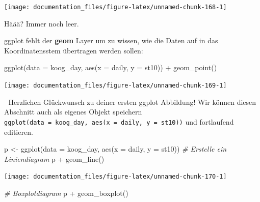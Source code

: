 \documentclass[
]{article}
\newenvironment{Shaded}{\begin{snugshade}}{\end{snugshade}}
\newcommand{\AttributeTok}[1]{\textcolor[rgb]{0.77,0.63,0.00}{#1}}
\newcommand{\CommentTok}[1]{\textcolor[rgb]{0.56,0.35,0.01}{\textit{#1}}}
\newcommand{\FunctionTok}[1]{\textcolor[rgb]{0.00,0.00,0.00}{#1}}
\newcommand{\NormalTok}[1]{#1}
\newcommand{\OtherTok}[1]{\textcolor[rgb]{0.56,0.35,0.01}{#1}}
\newcommand{\SpecialCharTok}[1]{\textcolor[rgb]{0.00,0.00,0.00}{#1}}
\begin{document}
\begin{center}\texttt{[image: documentation\_files/figure-latex/unnamed-chunk-168-1]} \end{center}

Häää? Immer noch leer.

ggplot fehlt der \textbf{geom} Layer um zu wissen, wie die Daten auf in das Koordinatensstem übertragen werden sollen:

\begin{Shaded}
\begin{Highlighting}[]
\FunctionTok{ggplot}\NormalTok{(}\AttributeTok{data =}\NormalTok{ koog\_day, }\FunctionTok{aes}\NormalTok{(}\AttributeTok{x =}\NormalTok{ daily, }\AttributeTok{y =}\NormalTok{ st10)) }\SpecialCharTok{+}
  \FunctionTok{geom\_point}\NormalTok{()}
\end{Highlighting}
\end{Shaded}

\begin{center}\texttt{[image: documentation\_files/figure-latex/unnamed-chunk-169-1]} \end{center}

🎉 Herzlichen Glückwunsch zu deiner ersten ggplot Abbildung! Wir können diesen Abschnitt auch als eigenes Objekt speichern \texttt{ggplot(data\ =\ koog\_day,\ aes(x\ =\ daily,\ y\ =\ st10))} und fortlaufend editieren.

\begin{Shaded}
\begin{Highlighting}[]
\NormalTok{p }\OtherTok{\textless{}{-}} \FunctionTok{ggplot}\NormalTok{(}\AttributeTok{data =}\NormalTok{ koog\_day, }\FunctionTok{aes}\NormalTok{(}\AttributeTok{x =}\NormalTok{ daily, }\AttributeTok{y =}\NormalTok{ st10))}
\CommentTok{\# Erstelle ein Liniendiagram}
\NormalTok{p }\SpecialCharTok{+} \FunctionTok{geom\_line}\NormalTok{()}
\end{Highlighting}
\end{Shaded}

\begin{center}\texttt{[image: documentation\_files/figure-latex/unnamed-chunk-170-1]} \end{center}

\begin{Shaded}
\begin{Highlighting}[]
\CommentTok{\# Boxplotdiagram}
\NormalTok{p }\SpecialCharTok{+} \FunctionTok{geom\_boxplot}\NormalTok{()}
\end{Highlighting}
\end{Shaded}
\end{document}
